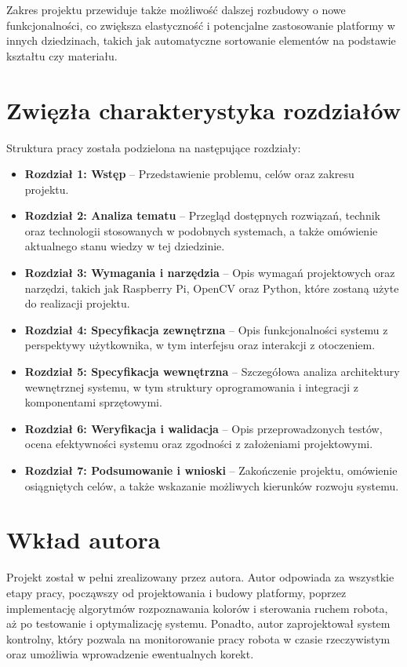 Zakres projektu przewiduje także możliwość dalszej rozbudowy o nowe funkcjonalności, co zwiększa elastyczność i potencjalne zastosowanie platformy w innych dziedzinach, takich jak automatyczne sortowanie elementów na podstawie kształtu czy materiału.

\section{Zwięzła charakterystyka rozdziałów}
\label{sec:charakterystyka}

Struktura pracy została podzielona na następujące rozdziały:

\begin{itemize}
    \item \textbf{Rozdział 1: Wstęp} – Przedstawienie problemu, celów oraz zakresu projektu.
    \item \textbf{Rozdział 2: Analiza tematu} – Przegląd dostępnych rozwiązań, technik oraz technologii stosowanych w podobnych systemach, a także omówienie aktualnego stanu wiedzy w tej dziedzinie.
    \item \textbf{Rozdział 3: Wymagania i narzędzia} – Opis wymagań projektowych oraz narzędzi, takich jak Raspberry Pi, OpenCV oraz Python, które zostaną użyte do realizacji projektu.
    \item \textbf{Rozdział 4: Specyfikacja zewnętrzna} – Opis funkcjonalności systemu z perspektywy użytkownika, w tym interfejsu oraz interakcji z otoczeniem.
    \item \textbf{Rozdział 5: Specyfikacja wewnętrzna} – Szczegółowa analiza architektury wewnętrznej systemu, w tym struktury oprogramowania i integracji z komponentami sprzętowymi.
    \item \textbf{Rozdział 6: Weryfikacja i walidacja} – Opis przeprowadzonych testów, ocena efektywności systemu oraz zgodności z założeniami projektowymi.
    \item \textbf{Rozdział 7: Podsumowanie i wnioski} – Zakończenie projektu, omówienie osiągniętych celów, a także wskazanie możliwych kierunków rozwoju systemu.
\end{itemize}

\section{Wkład autora}
\label{sec:wklad}

Projekt został w pełni zrealizowany przez autora. Autor odpowiada za wszystkie etapy pracy, począwszy od projektowania i budowy platformy, poprzez implementację algorytmów rozpoznawania kolorów i sterowania ruchem robota, aż po testowanie i optymalizację systemu. Ponadto, autor zaprojektował system kontrolny, który pozwala na monitorowanie pracy robota w czasie rzeczywistym oraz umożliwia wprowadzenie ewentualnych korekt.
